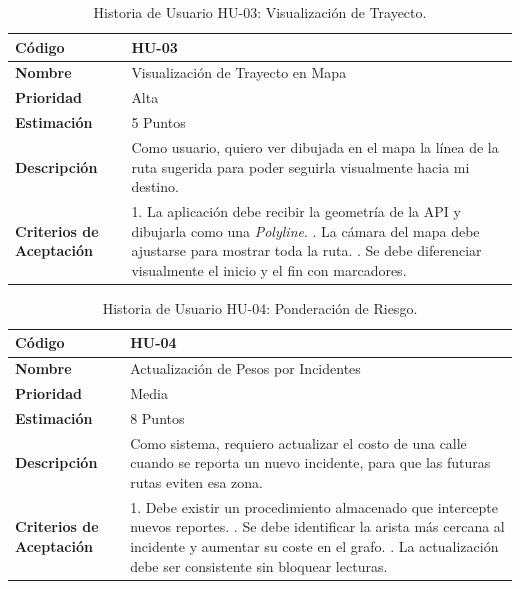 \begin{table}[H]
\caption{Historia de Usuario HU-03: Visualización de Trayecto.}
\label{tab:historias-usuario-3}
\centering
\begin{tabular}{|p{4cm}|p{10cm}|}
\hline
\textbf{Código} & HU-03 \\ \hline
\textbf{Nombre} & Visualización de Trayecto en Mapa \\ \hline
\textbf{Prioridad} & Alta \\ \hline
\textbf{Estimación} & 5 Puntos \\ \hline
\textbf{Descripción} &
Como usuario, quiero ver dibujada en el mapa la línea de la ruta sugerida para poder seguirla visualmente hacia mi destino. \\ \hline
\textbf{Criterios de Aceptación} &
1. La aplicación debe recibir la geometría de la API y dibujarla como una \textit{Polyline}. \newline
2. La cámara del mapa debe ajustarse para mostrar toda la ruta. \newline
3. Se debe diferenciar visualmente el inicio y el fin con marcadores. \\ \hline
\end{tabular}
\end{table}

\begin{table}[H]
\caption{Historia de Usuario HU-04: Ponderación de Riesgo.}
\label{tab:historias-usuario-4}
\centering
\begin{tabular}{|p{4cm}|p{10cm}|}
\hline
\textbf{Código} & HU-04 \\ \hline
\textbf{Nombre} & Actualización de Pesos por Incidentes \\ \hline
\textbf{Prioridad} & Media \\ \hline
\textbf{Estimación} & 8 Puntos \\ \hline
\textbf{Descripción} &
Como sistema, requiero actualizar el costo de una calle cuando se reporta un nuevo incidente, para que las futuras rutas eviten esa zona. \\ \hline
\textbf{Criterios de Aceptación} &
1. Debe existir un procedimiento almacenado que intercepte nuevos reportes. \newline
2. Se debe identificar la arista más cercana al incidente y aumentar su coste en el grafo. \newline
3. La actualización debe ser consistente sin bloquear lecturas. \\ \hline
\end{tabular}
\end{table} 

